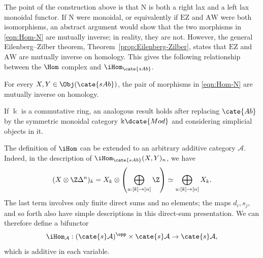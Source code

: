 The point of the construction above is that $\mathrm{N}$ is both a right
lax and a left lax monoidal functor. If $\mathrm{N}$ were monoidal, or
equivalently if $\mathrm{EZ}$ and $\mathrm{AW}$ were both isomorphisms, an
abstract argument would show that the two morphisms in \eqref{eqn:Hom-N}
are mutually inverse; in reality, they are not. However, the general
Eilenberg--Zilber theorem, Theorem~\ref{prop:Eilenberg-Zilber}, states that
$\mathrm{EZ}$ and $\mathrm{AW}$ are mutually inverse on homology. This gives
the following relationship between the $\Hom$ complex and
$\iHom_{\cate{sAb}}$.

\begin{proposition}
	For every $X,Y\in\Obj(\cate{sAb})$, the pair of morphisms in
	\eqref{eqn:Hom-N} are mutually inverse on homology.
\end{proposition}

If $\Bbbk$ is a commutative ring, an analogous result holds after replacing
$\cate{Ab}$ by the symmetric monoidal category $\Bbbk\dcate{Mod}$ and
considering simplicial objects in it.

\begin{remark}
	The definition of $\iHom$ can be extended to an arbitrary additive
	category $\mathcal{A}$. Indeed, in the description of
	$\iHom_{\cate{sAb}}(X,Y)_n$, we have
	\[
	(X\otimes\Z\Delta^n)_k
	=X_k\otimes\left(\bigoplus_{u:[k]\to[n]}\Z\right)
	\simeq\bigoplus_{u:[k]\to[n]}X_k.
	\]
	The last term involves only finite direct sums and no elements; the maps
	$d_i,s_j$, and so forth also have simple descriptions in this direct-sum
	presentation. We can therefore define a bifunctor
	\[
	\iHom_{\mathcal{A}}:(\cate{s}\mathcal{A})^{\opp}
	\times\cate{s}\mathcal{A}\to\cate{s}\mathcal{A},
	\]
	which is additive in each variable.
\end{remark}
